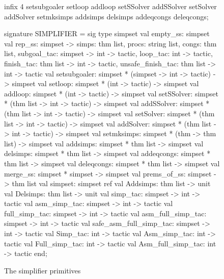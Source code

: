 \begin{figure}

\begin{ttbox}
infix 4 setsubgoaler setloop addloop setSSolver addSSolver setSolver addSolver 
        setmksimps addsimps delsimps addeqcongs deleqcongs;

signature SIMPLIFIER =
sig
  type simpset
  val empty_ss: simpset
  val rep_ss: simpset -> {simps: thm list, procs: string list, congs: thm list,
                          subgoal_tac:        simpset -> int -> tactic,
                          loop_tac:                      int -> tactic,
                                 finish_tac: thm list -> int -> tactic,
                          unsafe_finish_tac: thm list -> int -> tactic}
  val setsubgoaler: simpset *  (simpset -> int -> tactic) -> simpset
  val setloop:      simpset *             (int -> tactic) -> simpset
  val addloop:      simpset *             (int -> tactic) -> simpset
  val setSSolver:   simpset * (thm list -> int -> tactic) -> simpset
  val addSSolver:   simpset * (thm list -> int -> tactic) -> simpset
  val setSolver:    simpset * (thm list -> int -> tactic) -> simpset
  val addSolver:    simpset * (thm list -> int -> tactic) -> simpset
  val setmksimps:  simpset * (thm -> thm list) -> simpset
  val addsimps:    simpset * thm list -> simpset
  val delsimps:    simpset * thm list -> simpset
  val addeqcongs:  simpset * thm list -> simpset
  val deleqcongs:  simpset * thm list -> simpset
  val merge_ss:    simpset * simpset -> simpset
  val prems_of_ss: simpset -> thm list
  val simpset:     simpset ref
  val Addsimps: thm list -> unit
  val Delsimps: thm list -> unit
  val               simp_tac: simpset -> int -> tactic
  val           asm_simp_tac: simpset -> int -> tactic
  val          full_simp_tac: simpset -> int -> tactic
  val      asm_full_simp_tac: simpset -> int -> tactic
  val safe_asm_full_simp_tac: simpset -> int -> tactic
  val               Simp_tac:            int -> tactic
  val           Asm_simp_tac:            int -> tactic
  val          Full_simp_tac:            int -> tactic
  val      Asm_full_simp_tac:            int -> tactic
end;
\end{ttbox}
\caption{The simplifier primitives} \label{SIMPLIFIER}
\end{figure}


